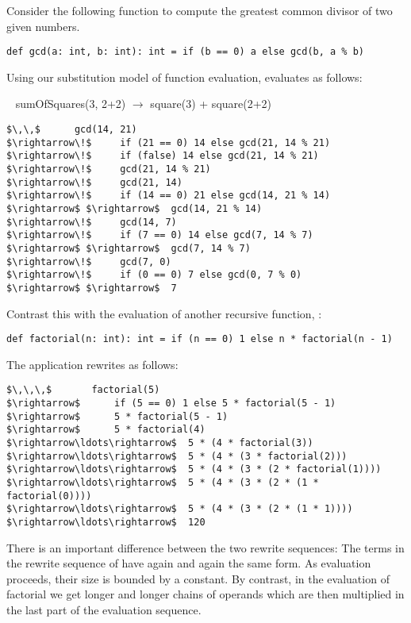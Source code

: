 \documentclass[a4paper,12pt,twoside,titlepage]{book}
\begin{document}
Consider the following function to compute the greatest common divisor
of two given numbers.

\begin{lstlisting}
def gcd(a: int, b: int): int = if (b == 0) a else gcd(b, a % b)
\end{lstlisting}

Using our substitution model of function evaluation, 
 evaluates as follows:

$\,\,\,$   sumOfSquares(3, 2+2)
$\rightarrow$  square(3) + square(2+2)

\begin{lstlisting}
$\,\,$      gcd(14, 21)  
$\rightarrow\!$     if (21 == 0) 14 else gcd(21, 14 % 21)
$\rightarrow\!$     if (false) 14 else gcd(21, 14 % 21)
$\rightarrow\!$     gcd(21, 14 % 21)
$\rightarrow\!$     gcd(21, 14)
$\rightarrow\!$     if (14 == 0) 21 else gcd(14, 21 % 14)
$\rightarrow$ $\rightarrow$  gcd(14, 21 % 14)
$\rightarrow\!$     gcd(14, 7)
$\rightarrow\!$     if (7 == 0) 14 else gcd(7, 14 % 7)
$\rightarrow$ $\rightarrow$  gcd(7, 14 % 7)
$\rightarrow\!$     gcd(7, 0)
$\rightarrow\!$     if (0 == 0) 7 else gcd(0, 7 % 0)
$\rightarrow$ $\rightarrow$  7
\end{lstlisting}

Contrast this with the evaluation of another recursive function, 
:

\begin{lstlisting}
def factorial(n: int): int = if (n == 0) 1 else n * factorial(n - 1)
\end{lstlisting}

The application  rewrites as follows:
\begin{lstlisting}
$\,\,\,$       factorial(5)
$\rightarrow$      if (5 == 0) 1 else 5 * factorial(5 - 1)
$\rightarrow$      5 * factorial(5 - 1)
$\rightarrow$      5 * factorial(4)
$\rightarrow\ldots\rightarrow$  5 * (4 * factorial(3))
$\rightarrow\ldots\rightarrow$  5 * (4 * (3 * factorial(2)))
$\rightarrow\ldots\rightarrow$  5 * (4 * (3 * (2 * factorial(1))))
$\rightarrow\ldots\rightarrow$  5 * (4 * (3 * (2 * (1 * factorial(0))))
$\rightarrow\ldots\rightarrow$  5 * (4 * (3 * (2 * (1 * 1))))
$\rightarrow\ldots\rightarrow$  120
\end{lstlisting}
There is an important difference between the two rewrite sequences:
The terms in the rewrite sequence of  have again and again
the same form. As evaluation proceeds, their size is bounded by a
constant. By contrast, in the evaluation of factorial we get longer
and longer chains of operands which are then multiplied in the last
part of the evaluation sequence.
\end{document}
